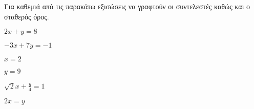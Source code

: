 Για καθεμιά από τις παρακάτω εξισώσεις να γραφτούν οι συντελεστές καθώς και ο σταθερός όρος.
\begin{multicols}{2}
\begin{rlist}[leftmargin=5mm]
\item $ 2x+y=8 $
\item $ -3x+7y=-1 $
\item $ x=2 $
\item $ y=9 $
\item $ \sqrt{2}x+\frac{y}{4}=1 $
\item $ 2x=y $
\end{rlist}
\end{multicols}
